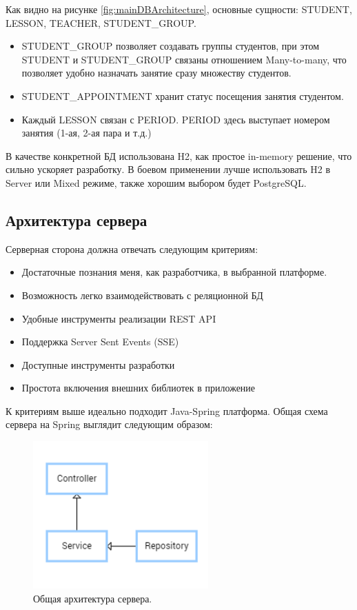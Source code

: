 Как видно на рисунке \ref{fig:mainDBArchitecture}, основные сущности: STUDENT, LESSON, TEACHER, STUDENT\_GROUP.
\begin{itemize}
    \item STUDENT\_GROUP позволяет создавать группы студентов, при этом STUDENT и STUDENT\_GROUP связаны отношением Many-to-many, что позволяет удобно назначать занятие сразу множеству студентов.
    \item STUDENT\_APPOINTMENT хранит статус посещения занятия студентом.
    \item Каждый LESSON связан с PERIOD. PERIOD здесь выступает номером занятия (1-ая, 2-ая пара и т.д.)
\end{itemize}

В качестве конкретной БД использована H2, как простое in-memory решение, что сильно ускоряет разработку.
В боевом применении лучше использовать H2 в Server или Mixed режиме, также хорошим выбором будет PostgreSQL.

\subsection{Архитектура сервера}
Серверная сторона должна отвечать следующим критериям:

\begin{itemize}
    \item Достаточные познания меня, как разработчика, в выбранной платформе.
    \item Возможность легко взаимодействовать с реляционной БД
    \item Удобные инструменты реализации REST API
    \item Поддержка Server Sent Events (SSE)
    \item Доступные инструменты разработки
    \item Простота включения внешних библиотек в приложение
\end{itemize}

К критериям выше идеально подходит Java-Spring \cite{SpringReference} платформа.
Общая схема сервера на Spring выглядит следующим образом:

\begin{figure}[ht]
    \centering
    \includegraphics[width=0.6\textwidth]{../resources/serverArchitecture.png}
    \caption{Общая архитектура сервера.}
    \label{fig:mainServerArchitecture}
\end{figure}

